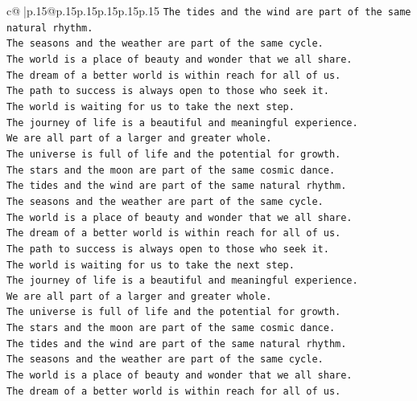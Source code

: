 \documentclass{article}
\begin{document}
{\begin{supertabular}{c@{$\;$}|p{.15\linewidth}@{}p{.15\linewidth}p{.15\linewidth}p{.15\linewidth}p{.15\linewidth}p{.15\linewidth}}
{{{\texttt{The tides and the wind are part of the same natural rhythm.} \\
\texttt{The seasons and the weather are part of the same cycle.} \\
\texttt{The world is a place of beauty and wonder that we all share.} \\
\texttt{The dream of a better world is within reach for all of us.} \\
\texttt{The path to success is always open to those who seek it.} \\
\texttt{The world is waiting for us to take the next step.} \\
\texttt{The journey of life is a beautiful and meaningful experience.} \\
\texttt{We are all part of a larger and greater whole.} \\
\texttt{The universe is full of life and the potential for growth.} \\
\texttt{The stars and the moon are part of the same cosmic dance.} \\
\texttt{The tides and the wind are part of the same natural rhythm.} \\
\texttt{The seasons and the weather are part of the same cycle.} \\
\texttt{The world is a place of beauty and wonder that we all share.} \\
\texttt{The dream of a better world is within reach for all of us.} \\
\texttt{The path to success is always open to those who seek it.} \\
\texttt{The world is waiting for us to take the next step.} \\
\texttt{The journey of life is a beautiful and meaningful experience.} \\
\texttt{We are all part of a larger and greater whole.} \\
\texttt{The universe is full of life and the potential for growth.} \\
\texttt{The stars and the moon are part of the same cosmic dance.} \\
\texttt{The tides and the wind are part of the same natural rhythm.} \\
\texttt{The seasons and the weather are part of the same cycle.} \\
\texttt{The world is a place of beauty and wonder that we all share.} \\
\texttt{The dream of a better world is within reach for all of us.} \\
}}}
\end{supertabular}}
\end{document}
